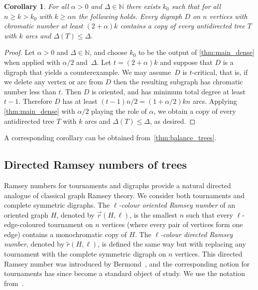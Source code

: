 \documentclass[11pt]{article}
\newtheorem{corollary}[theorem]{Corollary}
\numberwithin{equation}{section}
\renewcommand{\geq}{\geqslant}
\renewcommand{\leq}{\leqslant}
\newcommand{\defi}[1]{\emph{\color{red!50!black}#1}}
\def\NN{\mathbb N}
\theoremstyle{definition}
\begin{document}
\begin{corollary}
    For all $\alpha>0$ and $\Delta\in \NN$ there exists $k_0$ such that for all $n\geq k>k_0$ with $k\geq \alpha n$ the following holds. Every digraph $D$ on $n$ vertices with chromatic number at least $(2+\alpha)k$ contains a copy of every antidirected tree $T$ with $k$ arcs and $\Delta(T)\leq \Delta$.
\end{corollary}


\begin{proof}
    Let $\alpha>0$ and $\Delta\in \NN$, and choose $k_0$ to be the output of \cref{thm:main_dense} when applied with $\alpha/2$ and~$\Delta$. Let $t = (2+\alpha)k$ and suppose that $D$ is a digraph that yields a counterexample. We may assume~$D$ is $t$-critical, that is, if we delete any vertex or arc from $D$ then the resulting subgraph has chromatic number less than $t$. Then $D$ is oriented, and has minimum total degree at least $t-1$. Therefore $D$ has at least $(t-1)n/2 = (1+\alpha/2)kn$ arcs. Applying \cref{thm:main_dense} with $\alpha/2$ playing the role of $\alpha$, we obtain a copy of every antidirected tree $T$ with $k$ arcs and $\Delta(T)\leq \Delta$, as desired.
\end{proof}

A corresponding corollary can be obtained from~\cref{thm:balance_trees}.


\subsection{Directed Ramsey numbers of trees}

Ramsey numbers for tournaments and digraphs provide a natural directed analogue of classical graph Ramsey theory. We consider both tournaments and complete symmetric digraphs.
The \defi{$\ell$-colour oriented Ramsey number} of an oriented graph $H$, denoted by \defi{$\overrightarrow{r}(H,\ell)$}, is the smallest $n$ such that every $\ell$-edge-coloured tournament on $n$ vertices (where every pair of vertices form one edge) contains a monochromatic copy of $H$. The \defi{$\ell$-colour directed Ramsey number}, denoted by \defi{$\overleftrightarrow{r}(H,\ell)$}, is defined the same way but with replacing any tournament with the complete symmetric digraph on $n$ vertices. This directed Ramsey number was introduced by Bermond~\cite{BERMOND1974directedramsey}, and the corresponding notion for tournaments has since become a standard object of study. We use the notation from~\cite{bucic2017directed}.
\end{document}
